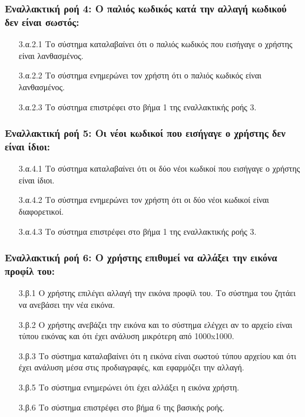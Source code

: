 \documentclass[12pt,a4paper]{article}
\begin{document}
\subsubsection*{Εναλλακτική ροή 4: Ο παλιός κωδικός κατά την αλλαγή κωδικού δεν είναι σωστός:}
\begin{enumerate}
    \item [3.α.2.1] Το σύστημα καταλαβαίνει ότι ο παλιός κωδικός που εισήγαγε ο χρήστης είναι λανθασμένος.
    \item [3.α.2.2] Το σύστημα ενημερώνει τον χρήστη ότι ο παλιός κωδικός είναι λανθασμένος.
    \item [3.α.2.3] Το σύστημα επιστρέφει στο βήμα 1 της εναλλακτικής ροής 3.
\end{enumerate}

\subsubsection*{Εναλλακτική ροή 5: Οι νέοι κωδικοί που εισήγαγε ο χρήστης δεν είναι ίδιοι:}
\begin{enumerate}
    \item [3.α.4.1] Το σύστημα καταλαβαίνει ότι οι δύο νέοι κωδικοί που εισήγαγε ο χρήστης είναι ίδιοι.
    \item [3.α.4.2] Το σύστημα ενημερώνει τον χρήστη ότι οι δύο νέοι κωδικοί είναι διαφορετικοί.
    \item [3.α.4.3] Το σύστημα επιστρέφει στο βήμα 1 της εναλλακτικής ροής 3.
\end{enumerate}

\subsubsection*{Εναλλακτική ροή 6: Ο χρήστης επιθυμεί να αλλάξει την εικόνα προφίλ του:}
\begin{enumerate}
    \item [3.β.1] Ο χρήστης επιλέγει αλλαγή την εικόνα προφίλ του. Το σύστημα του ζητάει να ανεβάσει την νέα εικόνα.
    \item [3.β.2] Ο χρήστης ανεβάζει την εικόνα και το σύστημα ελέγχει αν το αρχείο είναι τύπου εικόνας και ότι έχει ανάλυση μικρότερη από 1000x1000.
    \item [3.β.3] Το σύστημα καταλαβαίνει ότι η εικόνα είναι σωστού τύπου αρχείου και ότι έχει ανάλυση μέσα στις προδιαγραφές, και εφαρμόζει την αλλαγή.
    \item [3.β.5] Το σύστημα ενημερώνει ότι έχει αλλάξει η εικόνα χρήστη.
    \item [3.β.6] Το σύστημα επιστρέφει στο βήμα 6 της βασικής ροής.
\end{enumerate}
\end{document}

